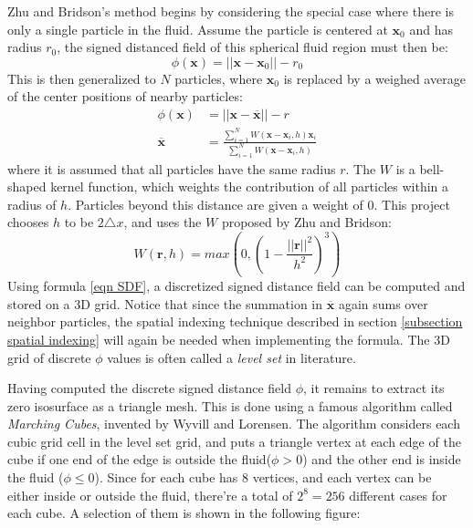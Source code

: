 Zhu and Bridson's method\cite{zhu2005animating} begins by considering the special case where there is only a single particle in the fluid. Assume the particle is centered at $\textbf{x}_0$ and has radius $r_0$, the signed distanced field of this spherical fluid region must then be:
$$
\phi(\textbf{x}) = ||\textbf{x}-\textbf{x}_0|| - r_0
$$
This is then generalized to $N$ particles, where $\textbf{x}_0$ is replaced by a weighed average of the center positions of nearby particles:
\begin{equation}
    \label{eqn SDF}
    \begin{aligned}
        \phi(\textbf{x}) &= ||\textbf{x}-\overline{\textbf{x}}|| - r \\
        \overline{\textbf{x}}&= \frac{\sum_{i=1}^{N} W(\textbf{x}-\textbf{x}_i,h)\textbf{x}_i}{\sum_{i=1}^{N} W(\textbf{x}-\textbf{x}_i,h)}
    \end{aligned}
\end{equation}
where it is assumed that all particles have the same radius $r$. The $W$ is a bell-shaped kernel function, which weights the contribution of all particles within a radius of $h$. Particles beyond this distance are given a weight of $0$. This project chooses $h$ to be $2\triangle x$, and uses the $W$ proposed by Zhu and Bridson:
$$
W(\textbf{r},h) = max(0,(1-\frac{||\textbf{r}||^2}{h^2})^3) 
$$
Using formula \ref{eqn SDF}, a discretized signed distance field can be computed and stored on a 3D grid. Notice that since the summation in $\overline{\textbf{x}}$ again sums over neighbor particles, the spatial indexing technique described in section \ref{subsection spatial indexing} will again be needed when implementing the formula. The 3D grid of discrete $\phi$ values is often called a \textit{level set} in literature\cite{bridson2015fluid}.


Having computed the discrete signed distance field $\phi$, it remains to extract its zero isosurface as a triangle mesh. This is done using a famous algorithm called \textit{Marching Cubes}, invented by Wyvill\cite{wyvill1986soft} and Lorensen\cite{lorensen1987marching}. The algorithm considers each cubic grid cell in the level set grid, and puts a triangle vertex at each edge of the cube if one end of the edge is outside the fluid($\phi>0$) and the other end is inside the fluid ($\phi\leq 0$). Since for each cube has 8 vertices, and each vertex can be either inside or outside the fluid, there're a total of $2^8=256$ different cases for each cube. A selection of them is shown in the following figure:

